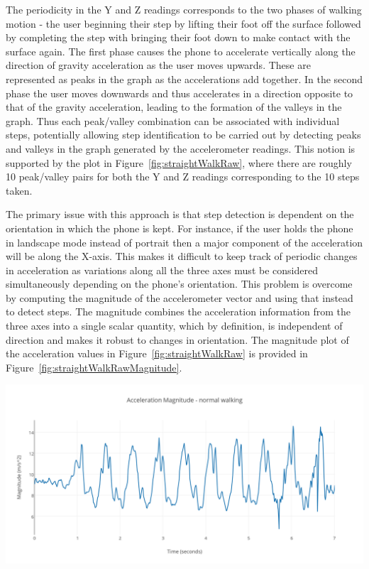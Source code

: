\documentclass[12pt,a4paper]{report}
\begin{document}
The periodicity in the Y and Z readings corresponds to the two phases of walking motion - the user beginning their step by lifting their foot off the surface followed by completing the step with bringing their foot down to make contact with the surface again. The first phase causes the phone to accelerate vertically along the direction of gravity acceleration as the user moves upwards. These are represented as peaks in the graph as the accelerations add together. In the second phase the user moves downwards and thus accelerates in a direction opposite to that of the gravity acceleration, leading to the formation of the valleys in the graph. Thus each peak/valley combination can be associated with individual steps, potentially allowing step identification to be carried out by detecting peaks and valleys in the graph generated by the accelerometer readings. This notion is supported by the plot in Figure~\ref{fig:straightWalkRaw}, where there are roughly 10 peak/valley pairs for both the Y and Z readings corresponding to the 10 steps taken.   

The primary issue with this approach is that step detection is dependent on the orientation in which the phone is kept. For instance, if the user holds the phone in landscape mode instead of portrait then a major component of the acceleration will  be along the X-axis. This makes it difficult to keep track of periodic changes in acceleration as variations along all the three axes must be considered simultaneously depending on the phone's orientation. This problem is overcome by computing the magnitude of the accelerometer vector and using that instead to detect steps. The magnitude combines the acceleration information from the three axes into a single scalar quantity, which by definition, is independent of direction and makes it robust to changes in orientation. The magnitude plot of the acceleration values in Figure~\ref{fig:straightWalkRaw} is provided in Figure~\ref{fig:straightWalkRawMagnitude}. 

\begin{center}
\includegraphics[scale=0.9]{images/straightWalkRawMagnitude.png}
\label{fig:straightWalkRawMagnitude}
\end{center}
\end{document}
